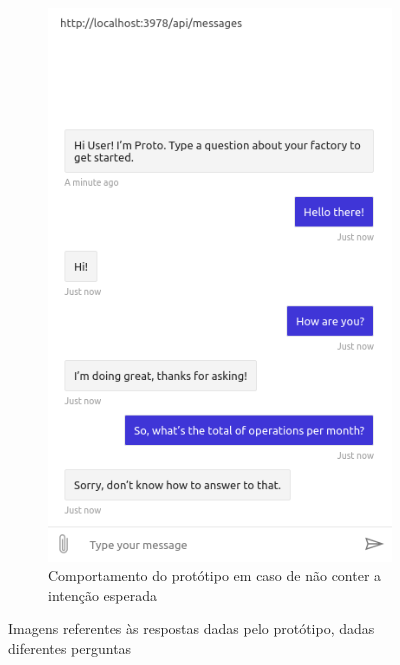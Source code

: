 \begin{figure}
\begin{subfigure}[t]{.48\textwidth}
        \includegraphics[width=.85\textwidth]{ch06/assets/response04.png}
        \caption{Comportamento do protótipo em caso de não conter a intenção esperada}
        \label{fig:nlanswers_noanswer}
     \end{subfigure}
\caption{Imagens referentes às respostas dadas pelo protótipo, dadas diferentes perguntas}
\label{fig:nlanswers}
\end{figure}

